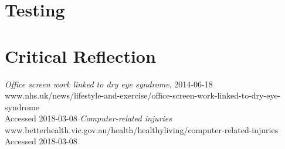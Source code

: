 \documentclass[12pt, a4paper]{report}
\begin{document}
\section{Testing}

\section{Critical Reflection}

\begin{thebibliography}{0}
    \textit{Office screen work linked to dry eye syndrome}, 2014-06-18\\
    www.nhs.uk/news/lifestyle-and-exercise/office-screen-work-linked-to-dry-eye-syndrome\\
    Accessed 2018-03-08
    \textit{Computer-related injuries}\\
    www.betterhealth.vic.gov.au/health/healthyliving/computer-related-injuries\\
    Accessed 2018-03-08
\end{thebibliography}
\end{document}
